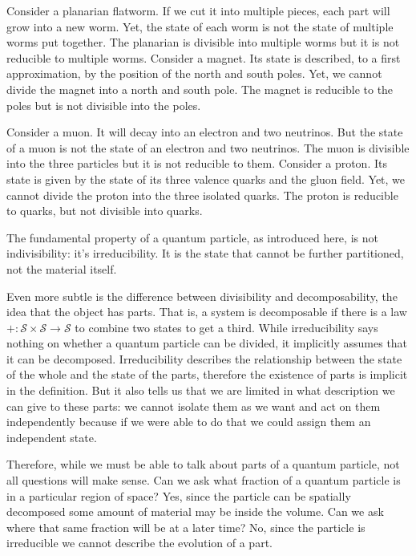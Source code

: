 \documentclass[smallextended]{svjour3}
\numberwithin{equation}{section}
\begin{document}
Consider a planarian flatworm. If we cut it into multiple pieces, each part will grow into a new worm. Yet, the state of each worm is not the state of multiple worms put together. The planarian is divisible into multiple worms but it is not reducible to multiple worms. Consider a magnet. Its state is described, to a first approximation, by the position of the north and south poles. Yet, we cannot divide the magnet into a north and south pole. The magnet is reducible to the poles but is not divisible into the poles.

Consider a muon. It will decay into an electron and two neutrinos. But the state of a muon is not the state of an electron and two neutrinos. The muon is divisible into the three particles but it is not reducible to them. Consider a proton. Its state is given by the state of its three valence quarks and the gluon field. Yet, we cannot divide the proton into the three isolated quarks. The proton is reducible to quarks, but not divisible into quarks.

The fundamental property of a quantum particle, as introduced here, is not indivisibility: it's irreducibility. It is the state that cannot be further partitioned, not the material itself.

Even more subtle is the difference between divisibility and decomposability, the idea that the object has parts. That is, a system is decomposable if there is a law $+ : \mathcal{S} \times \mathcal{S} \rightarrow \mathcal{S}$ to combine two states to get a third. While irreducibility says nothing on whether a quantum particle can be divided, it implicitly assumes that it can be decomposed. Irreducibility describes the relationship between the state of the whole and the state of the parts, therefore the existence of parts is implicit in the definition. But it also tells us that we are limited in what description we can give to these parts: we cannot isolate them as we want and act on them independently because if we were able to do that we could assign them an independent state.

Therefore, while we must be able to talk about parts of a quantum particle, not all questions will make sense. Can we ask what fraction of a quantum particle is in a particular region of space? Yes, since the particle can be spatially decomposed some amount of material may be inside the volume. Can we ask where that same fraction will be at a later time? No, since the particle is irreducible we cannot describe the evolution of a part.
\end{document}
